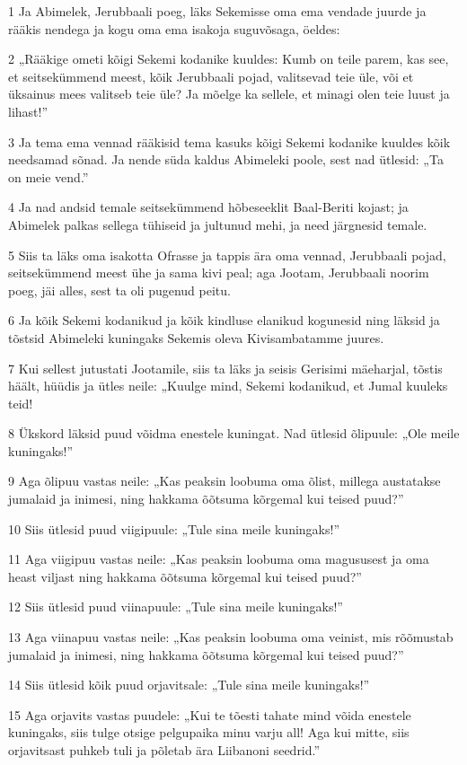\par 1 Ja Abimelek, Jerubbaali poeg, läks Sekemisse oma ema vendade juurde ja rääkis nendega ja kogu oma ema isakoja suguvõsaga, öeldes:
\par 2 „Rääkige ometi kõigi Sekemi kodanike kuuldes: Kumb on teile parem, kas see, et seitsekümmend meest, kõik Jerubbaali pojad, valitsevad teie üle, või et üksainus mees valitseb teie üle? Ja mõelge ka sellele, et minagi olen teie luust ja lihast!”
\par 3 Ja tema ema vennad rääkisid tema kasuks kõigi Sekemi kodanike kuuldes kõik needsamad sõnad. Ja nende süda kaldus Abimeleki poole, sest nad ütlesid: „Ta on meie vend.”
\par 4 Ja nad andsid temale seitsekümmend hõbeseeklit Baal-Beriti kojast; ja Abimelek palkas sellega tühiseid ja jultunud mehi, ja need järgnesid temale.
\par 5 Siis ta läks oma isakotta Ofrasse ja tappis ära oma vennad, Jerubbaali pojad, seitsekümmend meest ühe ja sama kivi peal; aga Jootam, Jerubbaali noorim poeg, jäi alles, sest ta oli pugenud peitu.
\par 6 Ja kõik Sekemi kodanikud ja kõik kindluse elanikud kogunesid ning läksid ja tõstsid Abimeleki kuningaks Sekemis oleva Kivisambatamme juures.
\par 7 Kui sellest jutustati Jootamile, siis ta läks ja seisis Gerisimi mäeharjal, tõstis häält, hüüdis ja ütles neile: „Kuulge mind, Sekemi kodanikud, et Jumal kuuleks teid!
\par 8 Ükskord läksid puud võidma enestele kuningat. Nad ütlesid õlipuule: „Ole meile kuningaks!”
\par 9 Aga õlipuu vastas neile: „Kas peaksin loobuma oma õlist, millega austatakse jumalaid ja inimesi, ning hakkama õõtsuma kõrgemal kui teised puud?”
\par 10 Siis ütlesid puud viigipuule: „Tule sina meile kuningaks!”
\par 11 Aga viigipuu vastas neile: „Kas peaksin loobuma oma magususest ja oma heast viljast ning hakkama õõtsuma kõrgemal kui teised puud?”
\par 12 Siis ütlesid puud viinapuule: „Tule sina meile kuningaks!”
\par 13 Aga viinapuu vastas neile: „Kas peaksin loobuma oma veinist, mis rõõmustab jumalaid ja inimesi, ning hakkama õõtsuma kõrgemal kui teised puud?”
\par 14 Siis ütlesid kõik puud orjavitsale: „Tule sina meile kuningaks!”
\par 15 Aga orjavits vastas puudele: „Kui te tõesti tahate mind võida enestele kuningaks, siis tulge otsige pelgupaika minu varju all! Aga kui mitte, siis orjavitsast puhkeb tuli ja põletab ära Liibanoni seedrid.”

